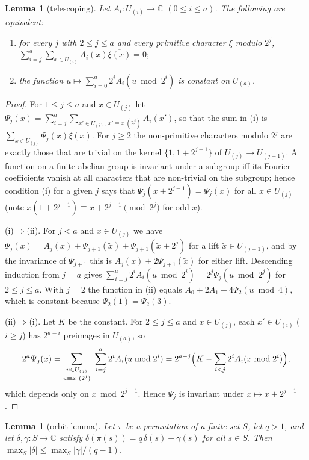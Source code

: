 \documentclass[11pt,a4paper]{article}
\newtheorem{lemma}[theorem]{Lemma}
\theoremstyle{definition}
\theoremstyle{remark}
\newcommand{\C}{\mathbb{C}}
\newcommand{\Uu}[1]{U_{(#1)}}
\begin{document}
\begin{lemma}[telescoping]\label{lem:telescope}
Let $A_i\colon\Uu i\to\C$ $(0\le i\le a)$. The following are equivalent:
\begin{enumerate}[label=\textup{(\roman*)}]
\item for every $j$ with $2\le j\le a$ and every primitive character $\xi$ modulo $2^j$,
\(\displaystyle\sum_{i=j}^a\sum_{x\in\Uu i}A_i(x)\overline{\xi(x)}=0;\)
\item the function $u\mapsto\sum_{i=0}^a2^iA_i(u\bmod 2^i)$ is constant on $\Uu a$.
\end{enumerate}
\end{lemma}

\begin{proof}
For $1\le j\le a$ and $x\in\Uu j$ let $\Psi_j(x)=\sum_{i=j}^a\sum_{x'\in\Uu i,\ x'\equiv x\ (2^j)}A_i(x')$, so that the sum in (i) is $\sum_{x\in\Uu j}\Psi_j(x)\overline{\xi(x)}$. For $j\ge2$ the non-primitive characters modulo $2^j$ are exactly those that are trivial on the kernel $\{1,1+2^{j-1}\}$ of $\Uu j\to\Uu{j-1}$. A function on a finite abelian group is invariant under a subgroup iff its Fourier coefficients vanish at all characters that are non-trivial on the subgroup; hence condition (i) for a given $j$ says that $\Psi_j(x+2^{j-1})=\Psi_j(x)$ for all $x\in\Uu j$ (note $x(1+2^{j-1})\equiv x+2^{j-1}\pmod{2^j}$ for odd $x$).

(i)$\Rightarrow$(ii). For $j<a$ and $x\in\Uu j$ we have $\Psi_j(x)=A_j(x)+\Psi_{j+1}(\tilde x)+\Psi_{j+1}(\tilde x+2^j)$ for a lift $\tilde x\in\Uu{j+1}$, and by the invariance of $\Psi_{j+1}$ this is $A_j(x)+2\Psi_{j+1}(\tilde x)$ for either lift. Descending induction from $j=a$ gives $\sum_{i=j}^a2^iA_i(u\bmod 2^i)=2^j\Psi_j(u\bmod2^j)$ for $2\le j\le a$. With $j=2$ the function in (ii) equals $A_0+2A_1+4\Psi_2(u\bmod 4)$, which is constant because $\Psi_2(1)=\Psi_2(3)$.

(ii)$\Rightarrow$(i). Let $K$ be the constant. For $2\le j\le a$ and $x\in\Uu j$, each $x'\in\Uu i$ ($i\ge j$) has $2^{a-i}$ preimages in $\Uu a$, so
\[
2^a\Psi_j(x)=\sum_{\substack{u\in\Uu a\\u\equiv x\ (2^j)}}\ \sum_{i=j}^a2^iA_i(u\bmod2^i)=2^{a-j}\Bigl(K-\sum_{i<j}2^iA_i(x\bmod 2^i)\Bigr),
\]
which depends only on $x\bmod 2^{j-1}$. Hence $\Psi_j$ is invariant under $x\mapsto x+2^{j-1}$.
\end{proof}

\begin{lemma}[orbit lemma]\label{lem:orbit}
Let $\pi$ be a permutation of a finite set $S$, let $q>1$, and let $\delta,\gamma\colon S\to\C$ satisfy $\delta(\pi(s))=q\,\delta(s)+\gamma(s)$ for all $s\in S$. Then $\max_S|\delta|\le\max_S|\gamma|/(q-1)$.
\end{lemma}
\end{document}
